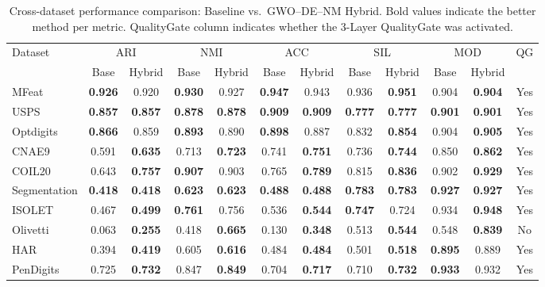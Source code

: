 \begin{table}[htbp]
\centering
\small
\caption{Cross-dataset performance comparison: Baseline vs.\ GWO--DE--NM Hybrid. Bold values indicate the better method per metric. QualityGate column indicates whether the 3-Layer QualityGate was activated.}
\label{tab:cross_dataset}
\begin{tabular}{lccccccccccc}
\toprule
Dataset & \multicolumn{2}{c}{ARI} & \multicolumn{2}{c}{NMI} & \multicolumn{2}{c}{ACC} & \multicolumn{2}{c}{SIL} & \multicolumn{2}{c}{MOD} & QG \\
\cmidrule(lr){2-3}\cmidrule(lr){4-5}\cmidrule(lr){6-7}\cmidrule(lr){8-9}\cmidrule(lr){10-11}
 & Base & Hybrid & Base & Hybrid & Base & Hybrid & Base & Hybrid & Base & Hybrid & \\
\midrule
MFeat & \textbf{0.926} & 0.920 & \textbf{0.930} & 0.927 & \textbf{0.947} & 0.943 & 0.936 & \textbf{0.951} & 0.904 & \textbf{0.904} & Yes \\
USPS & \textbf{0.857} & \textbf{0.857} & \textbf{0.878} & \textbf{0.878} & \textbf{0.909} & \textbf{0.909} & \textbf{0.777} & \textbf{0.777} & \textbf{0.901} & \textbf{0.901} & Yes \\
Optdigits & \textbf{0.866} & 0.859 & \textbf{0.893} & 0.890 & \textbf{0.898} & 0.887 & 0.832 & \textbf{0.854} & 0.904 & \textbf{0.905} & Yes \\
CNAE9 & 0.591 & \textbf{0.635} & 0.713 & \textbf{0.723} & 0.741 & \textbf{0.751} & 0.736 & \textbf{0.744} & 0.850 & \textbf{0.862} & Yes \\
COIL20 & 0.643 & \textbf{0.757} & \textbf{0.907} & 0.903 & 0.765 & \textbf{0.789} & 0.815 & \textbf{0.836} & 0.902 & \textbf{0.929} & Yes \\
Segmentation & \textbf{0.418} & \textbf{0.418} & \textbf{0.623} & \textbf{0.623} & \textbf{0.488} & \textbf{0.488} & \textbf{0.783} & \textbf{0.783} & \textbf{0.927} & \textbf{0.927} & Yes \\
ISOLET & 0.467 & \textbf{0.499} & \textbf{0.761} & 0.756 & 0.536 & \textbf{0.544} & \textbf{0.747} & 0.724 & 0.934 & \textbf{0.948} & Yes \\
Olivetti & 0.063 & \textbf{0.255} & 0.418 & \textbf{0.665} & 0.130 & \textbf{0.348} & 0.513 & \textbf{0.544} & 0.548 & \textbf{0.839} & No \\
HAR & 0.394 & \textbf{0.419} & 0.605 & \textbf{0.616} & 0.484 & \textbf{0.484} & 0.501 & \textbf{0.518} & \textbf{0.895} & 0.889 & Yes \\
PenDigits & 0.725 & \textbf{0.732} & 0.847 & \textbf{0.849} & 0.704 & \textbf{0.717} & 0.710 & \textbf{0.732} & \textbf{0.933} & 0.932 & Yes \\

\end{tabular}
\end{table}

